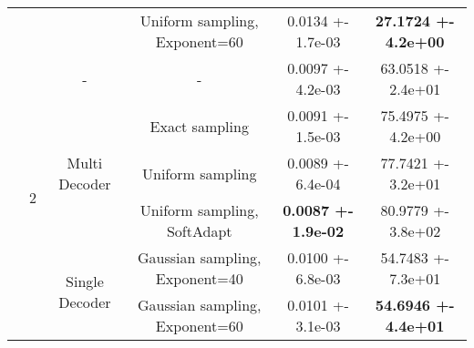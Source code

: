 \begin{tabular}{||c|c|c|c|c|c||}
\cline{4-6}
 &  &  & Uniform sampling, Exponent=60 & 0.0134 +- 1.7e-03 & \textbf{27.1724 +- 4.2e+00} \\
\cline{4-6}
\cline{3-6}
\cline{2-6}
 & \multirow{6}{*}{2} & \multirow{1}{*}{-} & - & 0.0097 +- 4.2e-03 & 63.0518 +- 2.4e+01 \\
\cline{4-6}
\cline{3-6}
 &  & \multirow{3}{*}{Multi Decoder} & Exact sampling & 0.0091 +- 1.5e-03 & 75.4975 +- 4.2e+00 \\
\cline{4-6}
 &  &  & Uniform sampling & 0.0089 +- 6.4e-04 & 77.7421 +- 3.2e+01 \\
\cline{4-6}
 &  &  & Uniform sampling, SoftAdapt & \textbf{0.0087 +- 1.9e-02} & 80.9779 +- 3.8e+02 \\
\cline{4-6}
\cline{3-6}
 &  & \multirow{2}{*}{Single Decoder} & Gaussian sampling, Exponent=40 & 0.0100 +- 6.8e-03 & 54.7483 +- 7.3e+01 \\
\cline{4-6}
 &  &  & Gaussian sampling, Exponent=60 & 0.0101 +- 3.1e-03 & \textbf{54.6946 +- 4.4e+01} \\
\cline{4-6}
\cline{3-6}
\cline{2-6}
\hline
\hline
\end{tabular}
